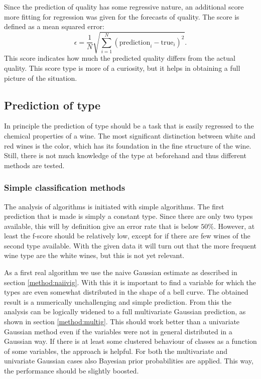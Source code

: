 \documentclass[twoside]{article}
\begin{document}
\begin{multicols}{2}
Since the prediction of quality has some regressive nature, an additional score more fitting for regression was given
for the forecasts of quality. The score is defined as a mean squared error:
\begin{equation}
 \epsilon = \frac{1}{N} \sqrt{ \sum_{i=1}^N ( \text{prediction}_i - \text{true}_i )^2 }.
\end{equation}
This score indicates how much the predicted quality differs from the actual quality. This score type is more of a curiosity,
but it helps in obtaining a full picture of the situation.

\subsection{Prediction of type}

In principle the prediction of type should be a task that is easily regressed to the chemical properties of a wine.
The most significant distinction between white and red wines is the color, which has its foundation in the fine structure of 
the wine. Still, there is not much knowledge of the type at beforehand and thus different methods are tested.

\subsubsection{Simple classification methods}

The analysis of algorithms is initiated with simple algorithms. The first prediction that is made is simply a constant
type. Since there are only two types available, this will by definition give an error rate that is below $50\%$. However,
at least the f-score should be relatively low, except for if there are few wines of the second type available. With the given
data it will turn out that the more frequent wine type are the white wines, but this is not yet relevant.

As a first real algorithm we use the naive Gaussian estimate as described in section \ref{method:naiivig}. With this it is
important to find a variable for which the types are even somewhat distributed in the shape of a bell curve. The obtained 
result is a numerically unchallenging and simple prediction. From this the analysis can be logically widened to a full
multivariate Gaussian prediction, as shown in section \ref{method:multig}. This should work better than a univariate
Gaussian method even if the variables were not in general distributed in a Gaussian way. If there is at least some
clustered behaviour of classes as a function of some variables, the approach is helpful. For both the multivariate
and univariate Gaussian cases also Bayesian prior probabilities are applied. This way, the performance should be 
slightly boosted.


\end{multicols}
\end{document}
